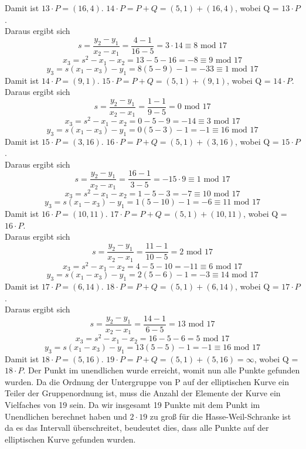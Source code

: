 Damit ist $13 \cdot P = (16, 4)$. $14 \cdot P = P + Q = (5, 1) + (16, 4)$, wobei Q = $13 \cdot P$.\\
Daraus ergibt sich 
$$s = \frac{y_2 - y_1}{x_2 -x_1} = \frac{4 - 1}{16 - 5} = 3 \cdot 14 \equiv 8 \text{ mod } 17$$
$$x_3 = s^2 - x_1 - x_2 = 13 - 5 - 16 = - 8 \equiv 9 \text{ mod } 17$$
$$y_3 = s(x_1 - x_3) - y_1 = 8(5 - 9) - 1 = - 33 \equiv 1 \text{ mod } 17$$
Damit ist $14 \cdot P = (9, 1)$. $15 \cdot P = P + Q = (5, 1) + (9, 1)$, wobei Q = $14 \cdot P$.\\
Daraus ergibt sich 
$$s = \frac{y_2 - y_1}{x_2 -x_1} = \frac{1 - 1}{9 - 5} = 0 \text{ mod } 17$$
$$x_3 = s^2 - x_1 - x_2 = 0 - 5 - 9 = - 14 \equiv 3 \text{ mod } 17$$
$$y_3 = s(x_1 - x_3) - y_1 = 0(5 - 3) - 1 = - 1 \equiv 16 \text{ mod } 17$$
Damit ist $15 \cdot P = (3, 16)$. $16 \cdot P = P + Q = (5, 1) + (3, 16)$, wobei Q = $15 \cdot P$.\\
Daraus ergibt sich 
$$s = \frac{y_2 - y_1}{x_2 -x_1} = \frac{16 - 1}{3 - 5} = - 15 \cdot 9 \equiv 1 \text{ mod } 17$$
$$x_3 = s^2 - x_1 - x_2 = 1 - 5 - 3 = - 7 \equiv 10 \text{ mod } 17$$
$$y_3 = s(x_1 - x_3) - y_1 = 1(5 - 10) - 1 = - 6 \equiv 11 \text{ mod } 17$$
Damit ist $16 \cdot P = (10, 11)$. $17 \cdot P = P + Q = (5, 1) + (10, 11)$, wobei Q = $16 \cdot P$.\\
Daraus ergibt sich 
$$s = \frac{y_2 - y_1}{x_2 -x_1} = \frac{11 - 1}{10 - 5} = 2 \text{ mod } 17$$
$$x_3 = s^2 - x_1 - x_2 = 4 - 5 - 10 = - 11 \equiv 6 \text{ mod } 17$$
$$y_3 = s(x_1 - x_3) - y_1 = 2(5 - 6) - 1 = - 3 \equiv 14 \text{ mod } 17$$
Damit ist $17 \cdot P = (6, 14)$. $18 \cdot P = P + Q = (5, 1) + (6, 14)$, wobei Q = $17 \cdot P$.\\
Daraus ergibt sich 
$$s = \frac{y_2 - y_1}{x_2 -x_1} = \frac{14 - 1}{6 - 5} = 13 \text{ mod } 17$$
$$x_3 = s^2 - x_1 - x_2 = 16 - 5 - 6 = 5 \text{ mod } 17$$
$$y_3 = s(x_1 - x_3) - y_1 = 13(5 - 5) - 1 = - 1 \equiv 16 \text{ mod } 17$$
Damit ist $18 \cdot P = (5, 16)$. $19 \cdot P = P + Q = (5, 1) + (5, 16) = \infty $, wobei Q = $18 \cdot P$. Der Punkt im unendlichen wurde erreicht, womit nun alle Punkte gefunden wurden. Da die Ordnung der Untergruppe von P auf der elliptischen Kurve ein Teiler der Gruppenordnung ist, muss die Anzahl der Elemente der Kurve ein Vielfaches von 19 sein. Da wir insgesamt 19 Punkte mit dem Punkt im Unendlichen berechnet haben und $2 \cdot 19$ zu groß für die Hasse-Weil-Schranke ist da es das Intervall überschreitet, beudeutet dies, dass alle Punkte auf der elliptischen Kurve gefunden wurden.\\

